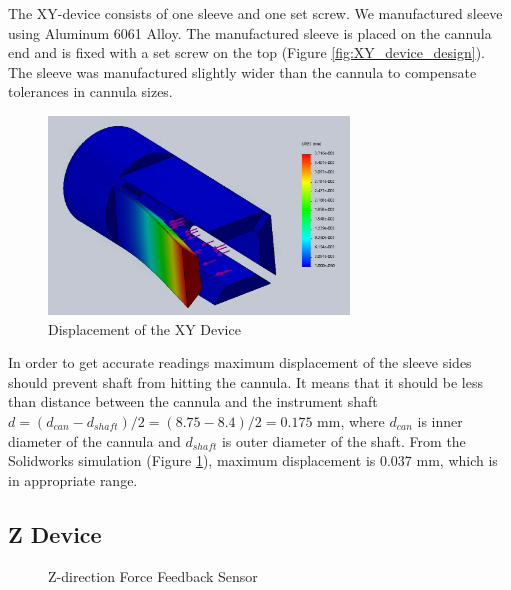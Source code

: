 The XY-device consists of one sleeve and one set screw. We manufactured sleeve using Aluminum 6061 Alloy. %
The manufactured sleeve is placed on the cannula end and is fixed with a set screw on the top (Figure \ref{fig:XY_device_design}). The sleeve was manufactured slightly wider than the cannula to compensate tolerances in cannula sizes.

\begin{figure}[h]
	\begin{center}
		\includegraphics[width=80mm]{fig/methods/old_sleeve_displ.png}
	\end{center}
	\vspace{-4mm}
	\caption[Displacement of the XY Device]
	{Displacement of the XY Device}
	\label{fig:xy-displ}
	\vspace{-2mm}
\end{figure}

In order to get accurate readings maximum displacement of the sleeve sides should prevent shaft from hitting the cannula. It means that it should be less than distance between the cannula and the instrument shaft $d=(d_{can} - d_{shaft})/2 = (8.75 - 8.4)/2 = 0.175$ mm, where $d_{can}$ is inner diameter of the cannula and $d_{shaft}$ is outer diameter of the shaft. From the Solidworks simulation (Figure \ref{fig:xy-displ}), maximum displacement is 0.037 mm, which is in appropriate range.

\subsection{Z Device}
\label{sec:zDir}

\begin{figure}[h]%
\centering
{}%
\qquad
{}%
\caption{Z-direction Force Feedback Sensor}
\label{fig:Z_device_design}%
\end{figure}

